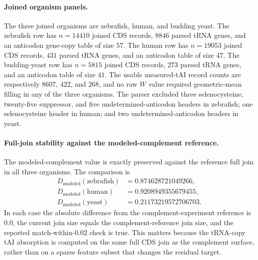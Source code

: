 \paragraph{Joined organism panels.}
The three joined organisms are zebrafish, human, and budding yeast.  The zebrafish row has $n=14410$ joined CDS records, $8846$ parsed tRNA genes, and an anticodon gene-copy table of size $57$.  The human row has $n=19053$ joined CDS records, $431$ parsed tRNA genes, and an anticodon table of size $47$.  The budding-yeast row has $n=5815$ joined CDS records, $273$ parsed tRNA genes, and an anticodon table of size $41$.  The usable measured-tAI record counts are respectively $8607$, $422$, and $268$, and no raw $W$ value required geometric-mean filling in any of the three organisms.  The parser excluded three selenocysteine, twenty-five suppressor, and five undetermined-anticodon headers in zebrafish; one selenocysteine header in human; and two undetermined-anticodon headers in yeast.

\paragraph{Full-join stability against the modeled-complement reference.}
The modeled-complement value is exactly preserved against the reference full join in all three organisms.  The comparison is
$$
\begin{aligned}
D_{\mathrm{modeled}}(\mathrm{zebrafish})&=0.874628721049266,\\
D_{\mathrm{modeled}}(\mathrm{human})&=0.9208949355679455,\\
D_{\mathrm{modeled}}(\mathrm{yeast})&=0.21173219572706703.
\end{aligned}
$$
In each case the absolute difference from the complement-experiment reference is $0.0$, the current join size equals the complement-reference join size, and the reported match-within-$0.02$ check is true.  This matters because the tRNA-copy tAI absorption is computed on the same full CDS join as the complement surface, rather than on a sparse feature subset that changes the residual target.

